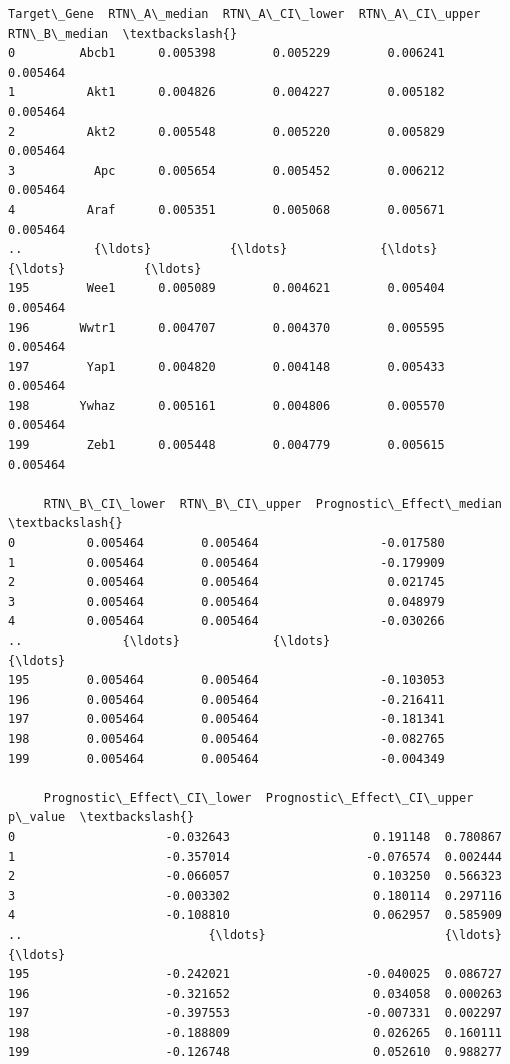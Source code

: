 \documentclass[11pt]{article}
\begin{document}
    
    \begin{Verbatim}[commandchars=\\\{\}]
    Target\_Gene  RTN\_A\_median  RTN\_A\_CI\_lower  RTN\_A\_CI\_upper  RTN\_B\_median  \textbackslash{}
0         Abcb1      0.005398        0.005229        0.006241      0.005464   
1          Akt1      0.004826        0.004227        0.005182      0.005464   
2          Akt2      0.005548        0.005220        0.005829      0.005464   
3           Apc      0.005654        0.005452        0.006212      0.005464   
4          Araf      0.005351        0.005068        0.005671      0.005464   
..          {\ldots}           {\ldots}             {\ldots}             {\ldots}           {\ldots}   
195        Wee1      0.005089        0.004621        0.005404      0.005464   
196       Wwtr1      0.004707        0.004370        0.005595      0.005464   
197        Yap1      0.004820        0.004148        0.005433      0.005464   
198       Ywhaz      0.005161        0.004806        0.005570      0.005464   
199        Zeb1      0.005448        0.004779        0.005615      0.005464   

     RTN\_B\_CI\_lower  RTN\_B\_CI\_upper  Prognostic\_Effect\_median  \textbackslash{}
0          0.005464        0.005464                 -0.017580   
1          0.005464        0.005464                 -0.179909   
2          0.005464        0.005464                  0.021745   
3          0.005464        0.005464                  0.048979   
4          0.005464        0.005464                 -0.030266   
..              {\ldots}             {\ldots}                       {\ldots}   
195        0.005464        0.005464                 -0.103053   
196        0.005464        0.005464                 -0.216411   
197        0.005464        0.005464                 -0.181341   
198        0.005464        0.005464                 -0.082765   
199        0.005464        0.005464                 -0.004349   

     Prognostic\_Effect\_CI\_lower  Prognostic\_Effect\_CI\_upper   p\_value  \textbackslash{}
0                     -0.032643                    0.191148  0.780867   
1                     -0.357014                   -0.076574  0.002444   
2                     -0.066057                    0.103250  0.566323   
3                     -0.003302                    0.180114  0.297116   
4                     -0.108810                    0.062957  0.585909   
..                          {\ldots}                         {\ldots}       {\ldots}   
195                   -0.242021                   -0.040025  0.086727   
196                   -0.321652                    0.034058  0.000263   
197                   -0.397553                   -0.007331  0.002297   
198                   -0.188809                    0.026265  0.160111   
199                   -0.126748                    0.052610  0.988277   


\end{Verbatim}
\end{document}
